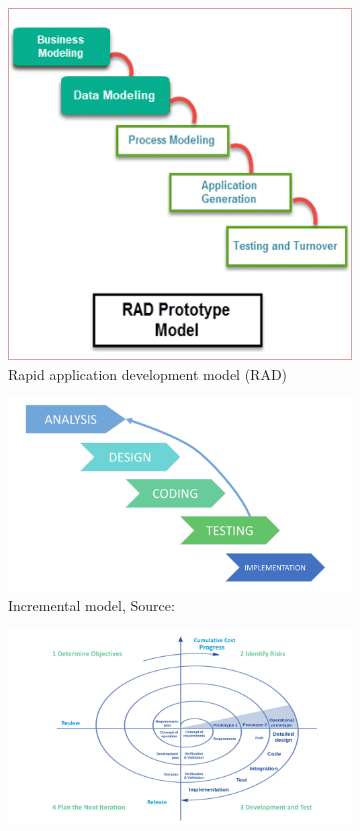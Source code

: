 \begin{figure}[htbp]
\begin{subfigure}[b]{0.45\textwidth}
		\includegraphics[width=\textwidth]{./rad}
		\caption{Rapid application development model (RAD)}
		\label{fig: 2}
	\end{subfigure}
	\hfill
	\begin{subfigure}[b]{0.45\textwidth}
		\centering
		\includegraphics[width=\textwidth]{./iterative}
		\caption{Incremental model, Source: \citet{Team:2017}}
		\label{fig: 3}
	\end{subfigure}
	\hfill
	\begin{subfigure}[b]{0.45\textwidth}
		\centering
		\includegraphics[width=\textwidth]{./Spiral}

\end{subfigure}
\end{figure}
